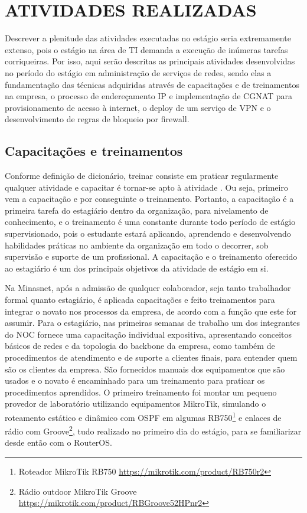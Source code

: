 \chapter{ATIVIDADES REALIZADAS}

    Descrever a plenitude das atividades executadas no estágio seria extremamente extenso, pois o estágio na área de TI demanda a execução de inúmeras tarefas corriqueiras. Por isso, aqui serão descritas as principais atividades desenvolvidas no período do estágio em administração de serviços de redes, sendo elas a fundamentação das técnicas adquiridas através de capacitações e de treinamentos na empresa, o processo de endereçamento IP e implementação de CGNAT para provisionamento de acesso à internet, o deploy de um serviço de VPN e o desenvolvimento de regras de bloqueio por firewall. 

\section{Capacitações e treinamentos}

    Conforme definição de dicionário, treinar consiste em praticar regularmente qualquer atividade e capacitar é tornar-se apto à atividade \cite{michaelis2015}. Ou seja, primeiro vem a capacitação e por conseguinte o treinamento. Portanto, a capacitação é a primeira tarefa do estagiário dentro da organização, para nivelamento de conhecimento, e o treinamento é uma constante durante todo período de estágio supervisionado, pois o estudante estará aplicando, aprendendo e desenvolvendo habilidades práticas no ambiente da organização em todo o decorrer, sob supervisão e suporte de um profissional. A capacitação e o treinamento oferecido ao estagiário é um dos principais objetivos da atividade de estágio em si.
    
    Na Minasnet, após a admissão de qualquer colaborador, seja tanto trabalhador formal quanto estagiário, é aplicada capacitações e feito treinamentos para integrar o novato nos processos da empresa, de acordo com a função que este for assumir. Para o estagiário, nas primeiras semanas de trabalho um dos integrantes do NOC fornece uma capacitação individual expositiva, apresentando conceitos básicos de redes e da topologia do backbone da empresa, como também de procedimentos de atendimento e de suporte a clientes finais, para entender quem são os clientes da empresa. São fornecidos manuais dos equipamentos que são usados e o novato é encaminhado para um treinamento para praticar os procedimentos aprendidos. O primeiro treinamento foi montar um pequeno provedor de laboratório utilizando equipamentos MikroTik, simulando o roteamento estático e dinâmico com OSPF em algumas RB750\footnote{Roteador MikroTik RB750 \url{https://mikrotik.com/product/RB750r2}} e enlaces de rádio com Groove\footnote{Rádio outdoor MikroTik Groove \url{https://mikrotik.com/product/RBGroove52HPnr2}}, tudo realizado no primeiro dia do estágio, para se familiarizar desde então com o RouterOS.
    
